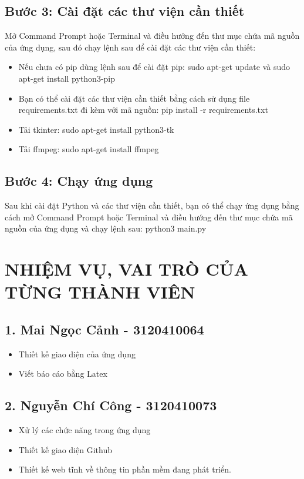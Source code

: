 \documentclass{article} %
\begin{document}
\subsection*{Bước 3: Cài đặt các thư viện cần thiết}
Mở Command Prompt hoặc Terminal và điều hướng đến thư mục chứa mã nguồn của ứng dụng, sau đó chạy lệnh sau để cài đặt các thư viện cần thiết:
\begin{itemize}
    \item Nếu chưa có pip dùng lệnh sau để cài đặt pip: sudo apt-get update và sudo apt-get install python3-pip
    \item Bạn có thể cài đặt các thư viện cần thiết bằng cách sử dụng file requirements.txt đi kèm với mã nguồn: pip install -r requirements.txt
    \item Tải tkinter: sudo apt-get install python3-tk
    \item Tải ffmpeg: sudo apt-get install ffmpeg
\end{itemize}
\subsection*{Bước 4: Chạy ứng dụng}
Sau khi cài đặt Python và các thư viện cần thiết, bạn có thể chạy ứng dụng bằng cách mở Command Prompt hoặc Terminal và điều hướng đến thư mục chứa mã nguồn của ứng dụng và chạy lệnh sau: python3 main.py
\newpage

\section*{NHIỆM VỤ, VAI TRÒ CỦA TỪNG THÀNH VIÊN}
\setcounter{section}{5}
\subsection*{1. Mai Ngọc Cảnh - 3120410064}
\begin{itemize}
    \item Thiết kế giao diện của ứng dụng
    \item Viết báo cáo bằng Latex
\end{itemize}
\subsection*{2. Nguyễn Chí Công - 3120410073}
\begin{itemize}
    \item Xử lý các chức năng trong ứng dụng
    \item Thiết kế giao diện Github
    \item Thiết kế web tĩnh về thông tin phần mềm đang phát triển.
\end{itemize}
\newpage
\end{document}
